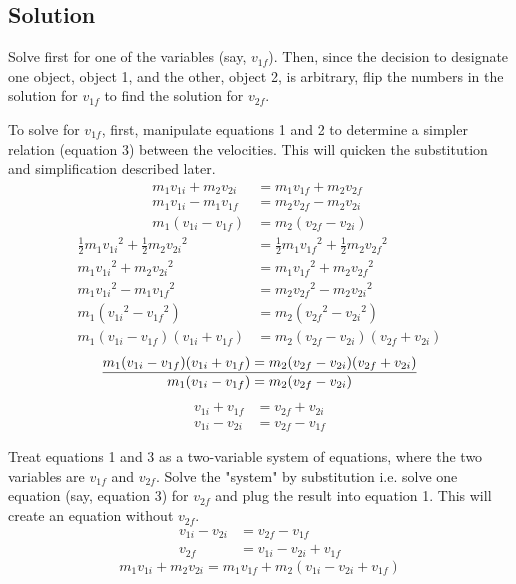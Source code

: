 \documentclass{article}
\begin{document}
\subsection{Solution}
Solve first for one of the variables (say, $v_{1f}$). Then, since the decision to designate one object, object 1, and the other, object 2, is arbitrary, flip the numbers in the solution for $v_{1f}$ to find the solution for $v_{2f}$.\par
To solve for $v_{1f}$, first, manipulate equations 1 and 2 to determine a simpler relation (equation 3) between the velocities. This will quicken the substitution and simplification described later.
\vspace{0em}
\begin{align*}
    m_1v_{1i}+m_2v_{2i} &= m_1v_{1f}+m_2v_{2f}\\
    m_1v_{1i}-m_1v_{1f} &= m_2v_{2f}-m_2v_{2i}\\
    m_1(v_{1i}-v_{1f}) &= m_2(v_{2f}-v_{2i})
\end{align*}
\begin{align*}
    \frac{1}{2}m_1{v_{1i}}^2+\frac{1}{2}m_2{v_{2i}}^2 &= \frac{1}{2}m_1{v_{1f}}^2+\frac{1}{2}m_2{v_{2f}}^2\\
    m_1{v_{1i}}^2+m_2{v_{2i}}^2 &= m_1{v_{1f}}^2+m_2{v_{2f}}^2\\
    m_1{v_{1i}}^2-m_1{v_{1f}}^2 &= m_2{v_{2f}}^2-m_2{v_{2i}}^2\\
    m_1({v_{1i}}^2-{v_{1f}}^2) &= m_2({v_{2f}}^2-{v_{2i}}^2)\\
    m_1(v_{1i}-v_{1f})(v_{1i}+v_{1f}) &= m_2(v_{2f}-v_{2i})(v_{2f}+v_{2i})
\end{align*}
\vspace{0em}
\begin{equation*}
    \frac{m_1(v_{1i}-v_{1f})(v_{1i}+v_{1f}) = m_2(v_{2f}-v_{2i})(v_{2f}+v_{2i})}{m_1(v_{1i}-v_{1f}) = m_2(v_{2f}-v_{2i})}\\
\end{equation*}
\vspace{-1.8em}
\begin{align*}
    v_{1i}+v_{1f} &= v_{2f}+v_{2i}\\
    v_{1i}-v_{2i} &= v_{2f}-v_{1f}\tag{3}
\end{align*}

Treat equations 1 and 3 as a two-variable system of equations, where the two variables are $v_{1f}$ and $v_{2f}$. Solve the "system" by substitution i.e. solve one equation (say, equation 3) for $v_{2f}$ and plug the result into equation 1. This will create an equation without $v_{2f}$.
\vspace{0em}
\begin{align*}
    v_{1i}-v_{2i} &= v_{2f}-v_{1f}\\
    v_{2f} &= v_{1i}-v_{2i}+v_{1f}
\end{align*}
\vspace{-0.5em}
\begin{equation*}
    m_1v_{1i}+m_2v_{2i} = m_1v_{1f}+m_2(v_{1i}-v_{2i}+v_{1f})
\end{equation*}
\end{document}
